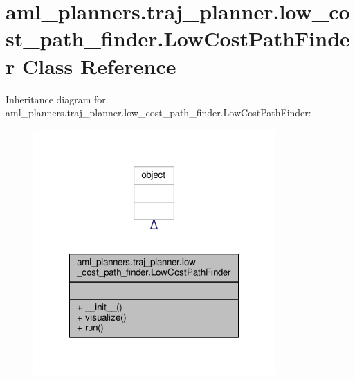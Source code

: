 \hypertarget{classaml__planners_1_1traj__planner_1_1low__cost__path__finder_1_1_low_cost_path_finder}{\section{aml\-\_\-planners.\-traj\-\_\-planner.\-low\-\_\-cost\-\_\-path\-\_\-finder.\-Low\-Cost\-Path\-Finder Class Reference}
\label{classaml__planners_1_1traj__planner_1_1low__cost__path__finder_1_1_low_cost_path_finder}
}


Inheritance diagram for aml\-\_\-planners.\-traj\-\_\-planner.\-low\-\_\-cost\-\_\-path\-\_\-finder.\-Low\-Cost\-Path\-Finder\-:
\nopagebreak
\begin{figure}[H]
\begin{center}
\leavevmode
\includegraphics[width=262pt]{classaml__planners_1_1traj__planner_1_1low__cost__path__finder_1_1_low_cost_path_finder__inherit__graph}
\end{center}
\end{figure}


